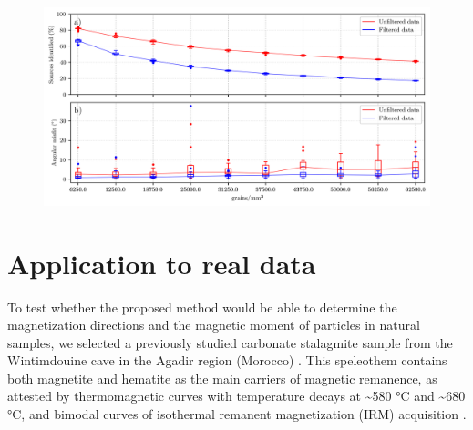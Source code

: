 \begin{figure}[tb!]
  \centering
  \includegraphics[width=1\linewidth]{paper/figures/grain-concentration.png}
  \caption{ 
  }
  \label{grain-concentration}
\end{figure}

\DIFaddend %
\section{Application to real data}

To test whether the proposed method would be able to determine the
magnetization directions and the magnetic moment of particles in natural
samples, we selected a previously studied carbonate stalagmite sample from the
Wintimdouine cave in the Agadir region (Morocco) \citep{Ait2019Hydro}. This
speleothem contains both magnetite and hematite as the main carriers of
magnetic remanence, as attested by thermomagnetic curves with temperature
decays at {\textasciitilde}580 °C and {\textasciitilde}680 °C, and bimodal
curves of isothermal remanent magnetization (IRM) acquisition \citep{carmo2019speleothem}.

